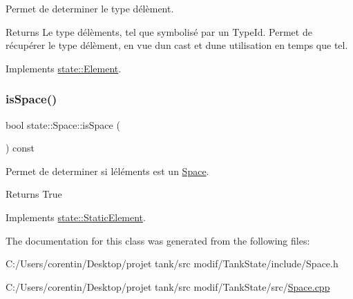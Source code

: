 Permet de determiner le type d\textquotesingle{}élèment. 

\begin{DoxyReturn}{Returns}
Le type d\textquotesingle{}élèments, tel que symbolisé par un Type\+Id. Permet de récupérer le type d\textquotesingle{}élèment, en vue d\textquotesingle{}un cast et d\textquotesingle{}une utilisation en temps que tel. 
\end{DoxyReturn}


Implements \hyperlink{classstate_1_1_element}{state\+::\+Element}.

\mbox{\label{classstate_1_1_space_ae6a875b398ebe11adca364c5dc8a94a9}} 
\subsubsection{\texorpdfstring{is\+Space()}{isSpace()}}
{\footnotesize\ttfamily bool state\+::\+Space\+::is\+Space (\begin{DoxyParamCaption}{ }\end{DoxyParamCaption}) const\hspace{0.3cm}{\ttfamily [virtual]}}



Permet de determiner si l\textquotesingle{}éléments est un \hyperlink{classstate_1_1_space}{Space}. 

\begin{DoxyReturn}{Returns}
True 
\end{DoxyReturn}


Implements \hyperlink{classstate_1_1_static_element}{state\+::\+Static\+Element}.



The documentation for this class was generated from the following files\+:\begin{DoxyCompactItemize}
\item 
C\+:/\+Users/corentin/\+Desktop/projet tank/src modif/\+Tank\+State/include/Space.\+h\item 
C\+:/\+Users/corentin/\+Desktop/projet tank/src modif/\+Tank\+State/src/\hyperlink{_space_8cpp}{Space.\+cpp}\end{DoxyCompactItemize}
